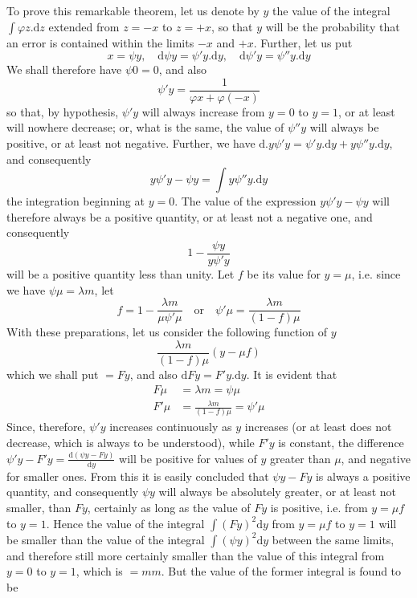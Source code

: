 To prove this remarkable theorem, let us denote by \(y\) the value of the integral \(\int\varphi z.\mathrm{d}z\) extended from \(z=-x\) to \(z=+x\), so that \(y\) will be the probability that an error is contained within the limits \(-x\) and \(+x\). Further, let us put
\[
x=\psi y,\quad \mathrm{d}\psi y=\psi'y.\mathrm{d}y,\quad \mathrm{d}\psi'y=\psi''y.\mathrm{d}y
\]
We shall therefore have \(\psi0=0\), and also
\[
\psi'y=\frac{1}{\varphi x+\varphi(-x)}
\]
so that, by hypothesis, \(\psi'y\) will always increase from \(y=0\) to \(y=1\), or at least will nowhere decrease; or, what is the same, the value of \(\psi''y\) will always be positive, or at least not negative. Further, we have \(\mathrm{d}.y\psi'y=\psi'y.\mathrm{d}y+y\psi''y.\mathrm{d}y\), and consequently
\[
y\psi'y-\psi y=\int y\psi''y.\mathrm{d}y
\]
the integration beginning at \(y=0\). The value of the expression \(y\psi'y-\psi y\) will therefore always be a positive quantity, or at least not a negative one, and consequently
\[
1-\frac{\psi y}{y\psi'y}
\]
will be a positive quantity less than unity. Let \(f\) be its value for \(y=\mu\), i.e. since we have \(\psi\mu=\lambda m\), let
\[
f=1-\frac{\lambda m}{\mu\psi'\mu}\quad\text{or}\quad\psi'\mu=\frac{\lambda m}{(1-f)\mu}
\]
With these preparations, let us consider the following function of \(y\)
\[
\frac{\lambda m}{(1-f)\mu}(y-\mu f)
\]
which we shall put \(=Fy\), and also \(\mathrm{d}Fy=F'y.\mathrm{d}y\). It is evident that
\[
\begin{aligned}
F\mu&=\lambda m=\psi\mu\\[3pt]
F'\mu&=\frac{\lambda m}{(1-f)\mu}=\psi'\mu
\end{aligned}
\]
Since, therefore, \(\psi'y\) increases continuously as \(y\) increases (or at least does not decrease, which is always to be understood), while \(F'y\) is constant, the difference \(\psi'y-F'y=\frac{\mathrm{d}(\psi y-Fy)}{\mathrm{d}y}\) will be positive for values of \(y\) greater than \(\mu\), and negative for smaller ones. From this it is easily concluded that \(\psi y-Fy\) is always a positive quantity, and consequently \(\psi y\) will always be absolutely greater, or at least not smaller, than \(Fy\), certainly as long as the value of \(Fy\) is positive, i.e. from \(y=\mu f\) to \(y=1\). Hence the value of the integral \(\int(Fy)^2\mathrm{d}y\) from \(y=\mu f\) to \(y=1\) will be smaller than the value of the integral \(\int(\psi y)^2\mathrm{d}y\) between the same limits, and therefore still more certainly smaller than the value of this integral from \(y=0\) to \(y=1\), which is \(=mm\). But the value of the former integral is found to be
